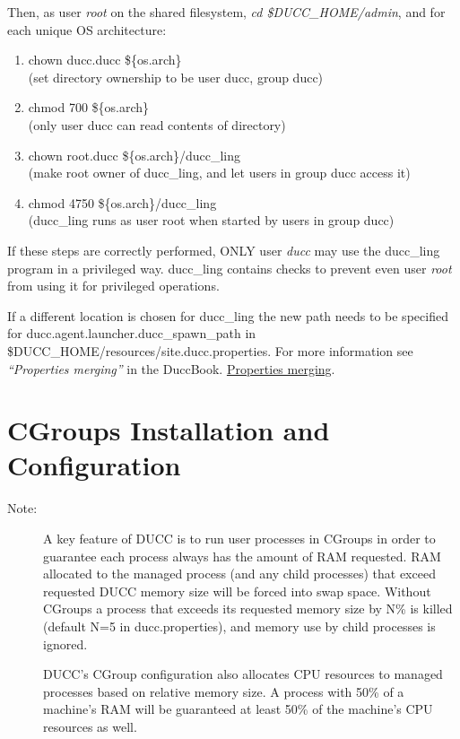      Then, as user {\em root} on the shared filesystem, {\em cd \$DUCC\_HOME/admin}, and for each unique OS architecture:
     \begin{enumerate}
        \item chown ducc.ducc \$\{os.arch\}
        \\ (set directory ownership to be user ducc, group ducc)
        \item chmod 700 \$\{os.arch\}
        \\ (only user ducc can read contents of directory)
        \item chown root.ducc \$\{os.arch\}/ducc\_ling
        \\ (make root owner of ducc\_ling, and let users in group ducc access it)
        \item chmod 4750 \$\{os.arch\}/ducc\_ling
        \\ (ducc\_ling runs as user root when started by users in group ducc)
     \end{enumerate}
          
If these steps are correctly performed, ONLY user {\em ducc} may use the ducc\_ling program in
a privileged way. ducc\_ling contains checks to prevent even user {\em root} from using it for
privileged operations.

If a different location is chosen for ducc\_ling the new path needs to be specified 
for ducc.agent.launcher.ducc\_spawn\_path in \$DUCC\_HOME/resources/site.ducc.properties.
For more information see
\ifdefined\DUCCSTANDALONE
{\em ``Properties merging''} in the DuccBook. 
\else
\hyperref[sec:admin.properties-merge] {Properties merging}. 
\fi


\section{CGroups Installation and Configuration}
\label{subsec:cgroup.configure}

\begin{description}
    \item[Note:] A key feature of DUCC is to run user processes in CGroups in order to guarantee
      each process always has the amount of RAM requested. RAM allocated to the managed process
      (and any child processes) that exceed requested DUCC memory size will be forced into swap space. 
      Without CGroups a process that exceeds its requested memory size by N\% is killed 
      (default N=5 in ducc.properties), and memory use by child processes is ignored.
      
      DUCC's CGroup configuration also allocates CPU resources to managed processes based on
      relative memory size. A process with 50\% of a machine's RAM will be guaranteed at least
      50\% of the machine's CPU resources as well. 
\end{description}

